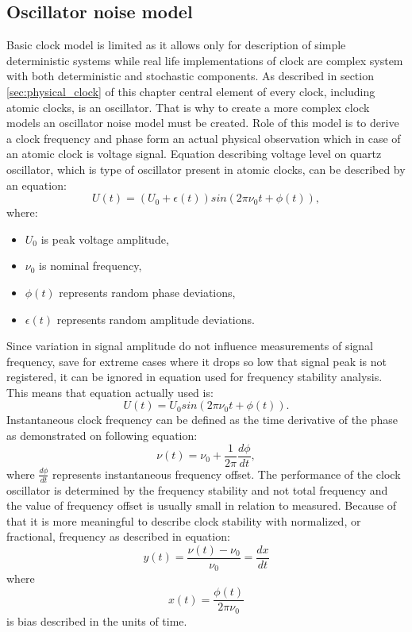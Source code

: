 \subsection{Oscillator noise model}
Basic clock model is limited as it allows only for description of simple deterministic systems 
while real life implementations of clock are complex system with both deterministic and 
stochastic components. 
As described in section \ref{sec:physical_clock} of this chapter central element of every clock,
including atomic clocks, is an oscillator. That is why to create a more complex clock models 
an oscillator noise model must be created.
Role of this model is to derive a clock frequency and phase form an actual physical observation 
which in case of an atomic clock is voltage signal.
Equation describing voltage level on quartz oscillator, which is type of oscillator present in
atomic clocks, can be described by an equation:
\begin{equation}
	\label{equ:quartz_voltage}
	U(t)=(U_{0}+\epsilon(t))sin(2\pi \nu_{0}t + \phi(t)),
\end{equation}
where:
\begin{itemize}
	\item $U_{0}$ is peak voltage amplitude,
	\item $\nu_{0}$ is nominal frequency,
	\item $\phi(t)$ represents random phase deviations,
	\item $\epsilon(t)$ represents random amplitude deviations.
\end{itemize}
Since variation in signal amplitude do not influence measurements of signal frequency, save for
extreme cases where it drops so low that signal peak is not registered, it can be ignored in 
equation used for frequency stability analysis.
This means that equation actually used is:
\begin{equation}
	\label{equ:quartz_voltage_simplified}
	U(t)=U_{0}sin(2\pi \nu_{0}t + \phi(t)).
\end{equation}
Instantaneous clock frequency can be defined as the time derivative of the phase as demonstrated
on following equation:
\begin{equation}
	\label{equ:inst_frequency}
	\nu(t) = \nu_{0}+ \frac{1}{2\pi} \frac{d\phi}{dt},
\end{equation}
where $\frac{d\phi}{dt}$ represents instantaneous frequency offset.
The performance of the clock oscillator is determined by the frequency stability and not 
total frequency and the value of frequency offset is usually small in relation to measured.
Because of that it is more meaningful to describe clock stability with normalized, or fractional,
frequency as described in equation:
\begin{equation}
	\label{equ:normalized_frequency}
	y(t) = \frac{\nu(t)-\nu_{0}}{\nu_{0}} = \frac{dx}{dt}
\end{equation}
where
\begin{equation}
	\label{equ:what_is_time_offset}
	x(t) = \frac{\phi(t)}{2\pi \nu_{0}}
\end{equation}
is bias described in the units of time.


